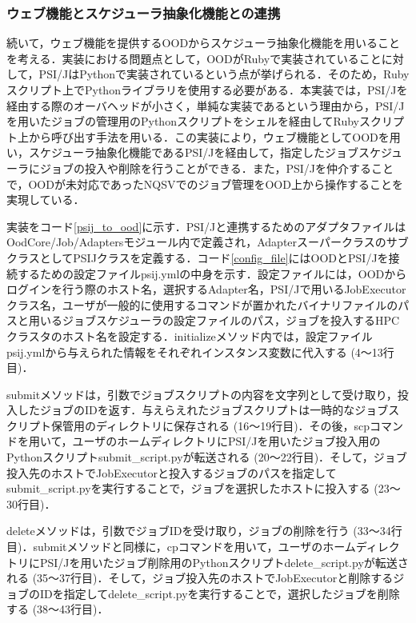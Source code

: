 \subsubsection{ウェブ機能とスケジューラ抽象化機能との連携}
続いて，ウェブ機能を提供するOODからスケジューラ抽象化機能を用いることを考える．実装における問題点として，OODがRubyで実装されていることに対して，PSI/JはPythonで実装されているという点が挙げられる\cite{cite9}\cite{cite10}．そのため，Rubyスクリプト上でPythonライブラリを使用する必要がある．本実装では，PSI/Jを経由する際のオーバヘッドが小さく，単純な実装であるという理由から，PSI/Jを用いたジョブの管理用のPythonスクリプトをシェルを経由してRubyスクリプト上から呼び出す手法を用いる．この実装により，ウェブ機能としてOODを用い，スケジューラ抽象化機能であるPSI/Jを経由して，指定したジョブスケジューラにジョブの投入や削除を行うことができる．また，PSI/Jを仲介することで，OODが未対応であったNQSVでのジョブ管理をOOD上から操作することを実現している．\par
実装をコード\ref{psij_to_ood}に示す．PSI/Jと連携するためのアダプタファイルはOodCore/Job/Adaptersモジュール内で定義され，AdapterスーパークラスのサブクラスとしてPSIJクラスを定義する．コード\ref{config_file}にはOODとPSI/Jを接続するための設定ファイルpsij.ymlの中身を示す．設定ファイルには，OODからログインを行う際のホスト名，選択するAdapter名，PSI/Jで用いるJobExecutorクラス名，ユーザが一般的に使用するコマンドが置かれたバイナリファイルのパスと用いるジョブスケジューラの設定ファイルのパス，ジョブを投入するHPCクラスタのホスト名を設定する．initializeメソッド内では，設定ファイルpsij.ymlから与えられた情報をそれぞれインスタンス変数に代入する (4～13行目)．\par
submitメソッドは，引数でジョブスクリプトの内容を文字列として受け取り，投入したジョブのIDを返す．与えらえれたジョブスクリプトは一時的なジョブスクリプト保管用のディレクトリに保存される (16～19行目)．その後，scpコマンドを用いて，ユーザのホームディレクトリにPSI/Jを用いたジョブ投入用のPythonスクリプトsubmit\_script.pyが転送される (20～22行目)．そして，ジョブ投入先のホストでJobExecutorと投入するジョブのパスを指定してsubmit\_script.pyを実行することで，ジョブを選択したホストに投入する (23～30行目)．\par
deleteメソッドは，引数でジョブIDを受け取り，ジョブの削除を行う (33～34行目)．submitメソッドと同様に，cpコマンドを用いて，ユーザのホームディレクトリにPSI/Jを用いたジョブ削除用のPythonスクリプトdelete\_script.pyが転送される (35～37行目)．そして，ジョブ投入先のホストでJobExecutorと削除するジョブのIDを指定してdelete\_script.pyを実行することで，選択したジョブを削除する (38～43行目)．

